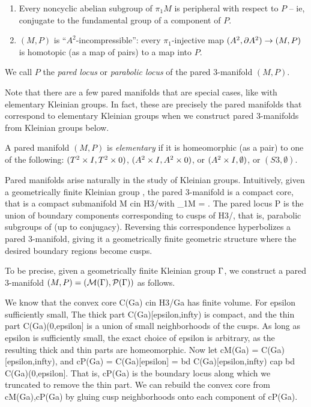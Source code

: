 \begin{prob}
\begin{defn}
\begin{enumerate}
\item Every noncyclic abelian subgroup of $\pi_1M$ is peripheral with respect
to $P$ -- ie, conjugate to the fundamental group of a component of $P$.

\item $(M,P)$ is ``$A^2$-incompressible'': every $\pi_1$-injective map $(A^2,
\partial A^2) \to (M,P)$ is homotopic (as a map of pairs) to a map into $P$.

\end{enumerate}

We call $P$ the \emph{pared locus} or \emph{parabolic locus} of the pared
3-manifold $(M,P)$.

\end{defn}

Note that there are a few pared manifolds that are special cases, like with
elementary Kleinian groups. In fact, these are precisely the pared manifolds
that correspond to elementary Kleinian groups when we construct pared
3-manifolds from Kleinian groups below.

\begin{defn}

A pared manifold $(M,P)$ is \emph{elementary} if it is homeomorphic (as a pair)
to one of the following: $(T^2\times I,T^2\times 0)$, $(A^2\times I,A^2\times 0)$, or $(A^2\times
I,\emptyset)$, or $(S3,\emptyset)$.

\end{defn}

Pared manifolds arise naturally in the study of Kleinian groups. Intuitively,
given a geometrically finite Kleinian group \Ga, the pared 3-manifold is
a compact core, that is a compact submanifold M cin H3/\Ga with \pi_1M = \Ga.
The pared locus P is the union of boundary components corresponding to cusps of
H3/\Ga, that is, parabolic subgroups of \Ga (up to conjugacy). Reversing
this correspondence hyperbolizes a pared 3-manifold, giving it a geometrically
finite geometric structure where the desired boundary regions become cusps.

To be precise, given a geometrically finite Kleinian group $\Gamma$, we construct
a pared 3-manifold $(M,P)=(\mathcal{M}(\Gamma),\mathcal{P}(\Gamma))$ as follows.

We know that the convex core C(Ga) cin H3/Ga has finite volume. For epsilon
sufficiently small, The thick part C(Ga)[epsilon,infty) is compact, and the
thin part C(Ga)(0,epsilon] is a union of small neighborhoods of the cusps.  As
long as epsilon is sufficiently small, the exact choice of epsilon is
arbitrary, as the resulting thick and thin parts are homeomorphic. Now let
cM(Ga) = C(Ga)[epsilon,infty), and cP(Ga) = C(Ga)[epsilon] = bd
C(Ga)[epsilon,infty) cap bd C(Ga)(0,epsilon]. That is, cP(Ga) is the boundary
locus along which we truncated to remove the thin part. We can rebuild the
convex core from cM(Ga),cP(Ga) by gluing cusp neighborhoods onto each component
of cP(Ga).


\end{prob}
